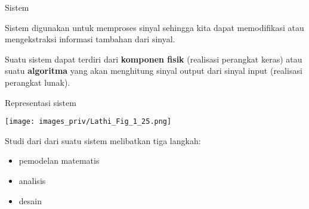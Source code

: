 \begin{frame}{Sistem}

Sistem digunakan untuk memproses sinyal sehingga kita dapat memodifikasi atau
mengekstraksi informasi tambahan dari sinyal.

Suatu sistem dapat terdiri dari \textbf{komponen fisik} (realisasi
perangkat keras)
atau suatu \textbf{algoritma} yang akan menghitung sinyal output dari
sinyal input (realisasi perangkat lunak).

\end{frame}



\begin{frame}{Representasi sistem}

{\centering
\texttt{[image: images\_priv/Lathi\_Fig\_1\_25.png]}
\par}

\end{frame}


\begin{frame}

Studi dari dari suatu sistem melibatkan tiga langkah:
\begin{itemize}
\item pemodelan matematis
\item analisis
\item desain
\end{itemize}

\end{frame}


